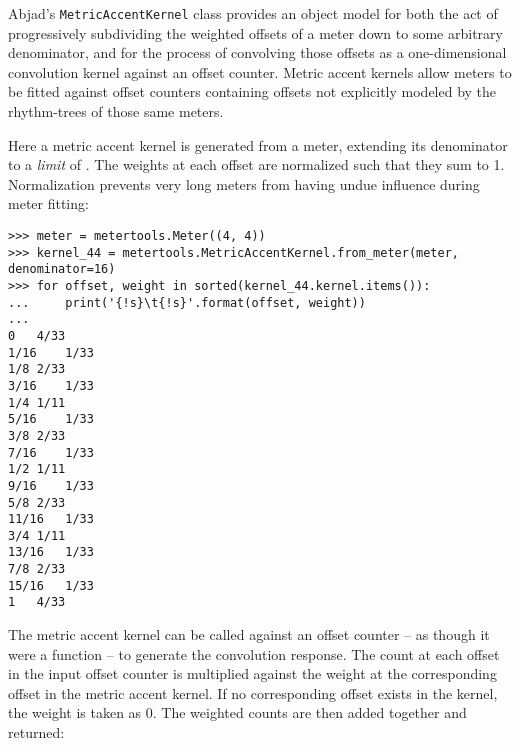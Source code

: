 Abjad's \texttt{MetricAccentKernel} class provides an object model for both the
act of progressively subdividing the weighted offsets of a meter down to some
arbitrary denominator, and for the process of convolving those offsets as a
one-dimensional convolution kernel against an offset counter. Metric accent
kernels allow meters to be fitted against offset counters containing offsets
not explicitly modeled by the rhythm-trees of those same meters.

Here a metric accent kernel is generated from a  meter, extending
its denominator to a \emph{limit} of . The weights at each offset
are normalized such that they sum to 1. Normalization prevents very long meters
from having undue influence during meter fitting:

\begin{comment}
<abjad>
meter = metertools.Meter((4, 4))
kernel_44 = metertools.MetricAccentKernel.from_meter(meter, denominator=16)
for offset, weight in sorted(kernel_44.kernel.items()):
    print('{!s}\t{!s}'.format(offset, weight))

</abjad>
\end{comment}

\begin{abjadbookoutput}
\begin{singlespacing}
\vspace{-0.5\baselineskip}
\begin{verbatim}
>>> meter = metertools.Meter((4, 4))
>>> kernel_44 = metertools.MetricAccentKernel.from_meter(meter, denominator=16)
>>> for offset, weight in sorted(kernel_44.kernel.items()):
...     print('{!s}\t{!s}'.format(offset, weight))
...
0	4/33
1/16	1/33
1/8	2/33
3/16	1/33
1/4	1/11
5/16	1/33
3/8	2/33
7/16	1/33
1/2	1/11
9/16	1/33
5/8	2/33
11/16	1/33
3/4	1/11
13/16	1/33
7/8	2/33
15/16	1/33
1	4/33
\end{verbatim}
\end{singlespacing}
\end{abjadbookoutput}

\noindent The  metric accent kernel can be called against an offset
counter -- as though it were a function -- to generate the convolution
response. The count at each offset in the input offset counter is multiplied
against the weight at the corresponding offset in the metric accent kernel. If
no corresponding offset exists in the kernel, the weight is taken as 0. The
weighted counts are then added together and returned:

\begin{comment}
<abjad>
response = kernel_44(piano_staff_counter)
float(response)
</abjad>
\end{comment}

